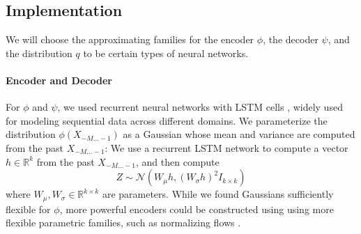 \documentclass[11pt,letterpaper]{article}
\begin{document}



\subsection{Implementation}
We will choose the approximating families for the encoder $\phi$, the decoder $\psi$, and the distribution $q$ to be certain types of neural networks.
\paragraph{Encoder and Decoder}
For $\phi$ and $\psi$, we used recurrent neural networks with LSTM cells \citep{hochreiter-long-1997}, widely used for modeling sequential data across different domains.
We parameterize the distribution $\phi(X_{-M\dots-1})$ as a Gaussian whose mean and variance are computed from the past $X_{-M\dots-1}$:
We use a recurrent LSTM network to compute a vector $h \in \mathbb{R}^k$ from the past $X_{-M\dots-1}$, and then compute
\begin{equation}
	Z \sim \mathcal{N}(W_\mu h, (W_\sigma h)^2 I_{k\times k})
\end{equation}
where $W_\mu, W_\sigma \in \mathbb{R}^{k\times k}$ are parameters.
While we found Gaussians sufficiently flexible for $\phi$, more powerful encoders could be constructed using using more flexible parametric families, such as normalizing flows \citep{rezende-variational-2015, kingma-improving-2016}.
\end{document}
